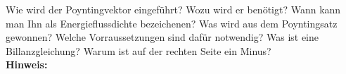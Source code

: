 \begin{question}[section=2,subsection=23,name={Poynting Vektor},difficulty=3,type=mdl,mode=exm,tags={}]
	Wie wird der Poyntingvektor eingeführt? Wozu wird er benötigt? Wann kann man Ihn als Energieflussdichte bezeichenen? Was wird aus dem Poyntingsatz gewonnen? Welche Vorraussetzungen sind dafür notwendig? Was ist eine Billanzgleichung? Warum ist auf der rechten Seite ein Minus?
	\\ \textbf{Hinweis:}\\
	
\end{question}
\begin{solution}
	
\end{solution}